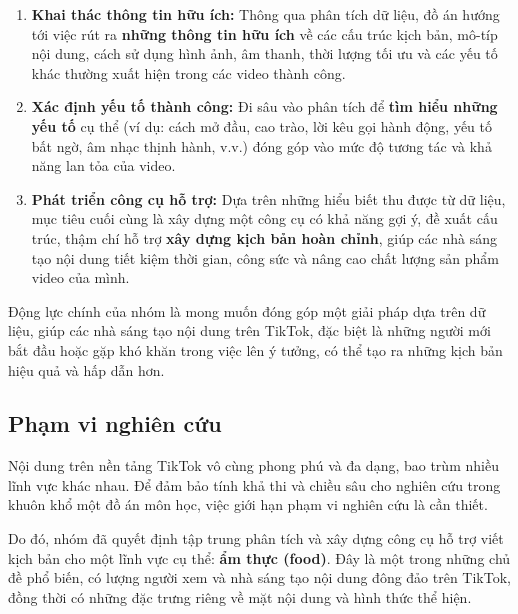 \begin{enumerate}
    \item \textbf{Khai thác thông tin hữu ích:} Thông qua phân tích dữ liệu, đồ án hướng tới việc rút ra \textbf{những thông tin hữu ích} về các cấu trúc kịch bản, mô-típ nội dung, cách sử dụng hình ảnh, âm thanh, thời lượng tối ưu và các yếu tố khác thường xuất hiện trong các video thành công.
    
    \item \textbf{Xác định yếu tố thành công:} Đi sâu vào phân tích để \textbf{tìm hiểu những yếu tố} cụ thể (ví dụ: cách mở đầu, cao trào, lời kêu gọi hành động, yếu tố bất ngờ, âm nhạc thịnh hành, v.v.) đóng góp vào mức độ tương tác và khả năng lan tỏa của video.
    
    \item \textbf{Phát triển công cụ hỗ trợ:} Dựa trên những hiểu biết thu được từ dữ liệu, mục tiêu cuối cùng là xây dựng một công cụ có khả năng gợi ý, đề xuất cấu trúc, thậm chí hỗ trợ \textbf{xây dựng kịch bản hoàn chỉnh}, giúp các nhà sáng tạo nội dung tiết kiệm thời gian, công sức và nâng cao chất lượng sản phẩm video của mình.
\end{enumerate}

Động lực chính của nhóm là mong muốn đóng góp một giải pháp dựa trên dữ liệu, giúp các nhà sáng tạo nội dung trên TikTok, đặc biệt là những người mới bắt đầu hoặc gặp khó khăn trong việc lên ý tưởng, có thể tạo ra những kịch bản hiệu quả và hấp dẫn hơn.

\subsection{Phạm vi nghiên cứu}

Nội dung trên nền tảng TikTok vô cùng phong phú và đa dạng, bao trùm nhiều lĩnh vực khác nhau. Để đảm bảo tính khả thi và chiều sâu cho nghiên cứu trong khuôn khổ một đồ án môn học, việc giới hạn phạm vi nghiên cứu là cần thiết.

Do đó, nhóm đã quyết định tập trung phân tích và xây dựng công cụ hỗ trợ viết kịch bản cho một lĩnh vực cụ thể: \textbf{ẩm thực (food)}. Đây là một trong những chủ đề phổ biến, có lượng người xem và nhà sáng tạo nội dung đông đảo trên TikTok, đồng thời có những đặc trưng riêng về mặt nội dung và hình thức thể hiện.

